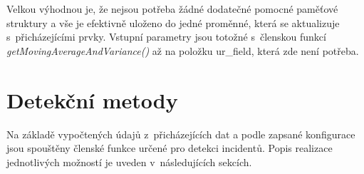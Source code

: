 \begin{itemize}
 Velkou výhodnou je, že nejsou potřeba žádné dodatečné pomocné paměťové struktury a vše je 
 efektivně uloženo do jedné proměnné, která se aktualizuje s~přicházejícími prvky. Vstupní
 parametry jsou totožné s~členskou funkcí \textit{getMovingAverageAndVariance()} až na položku
 {ur\_field}, která zde není potřeba.
\end{itemize}

\section{Detekční metody} \label{detectMethods}
 Na základě vypočtených údajů z~přicházejících dat a podle zapsané konfigurace jsou spouštěny
 členské funkce určené pro detekci incidentů. Popis realizace jednotlivých možností je uveden
 v~následujících sekcích.
 
